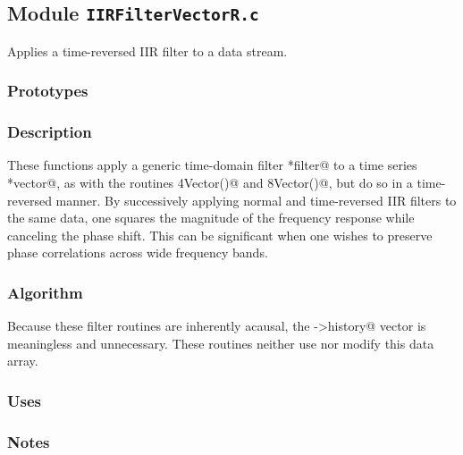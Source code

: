 
\subsection{Module \texttt{IIRFilterVectorR.c}}

Applies a time-reversed IIR filter to a data stream.

\subsubsection{Prototypes}
\vspace{0.1in}


\subsubsection{Description}

These functions apply a generic time-domain filter \verb@*filter@ to a
time series \verb@*vector@, as with the routines
\verb@IIRFilterREAL4Vector()@ and \verb@IIRFilterREAL8Vector()@, but
do so in a time-reversed manner.  By successively applying normal and
time-reversed IIR filters to the same data, one squares the magnitude
of the frequency response while canceling the phase shift.  This can
be significant when one wishes to preserve phase correlations across
wide frequency bands.

\subsubsection{Algorithm}

Because these filter routines are inherently acausal, the
\verb@filter->history@ vector is meaningless and unnecessary.  These
routines neither use nor modify this data array.

\subsubsection{Uses}

\subsubsection{Notes}

